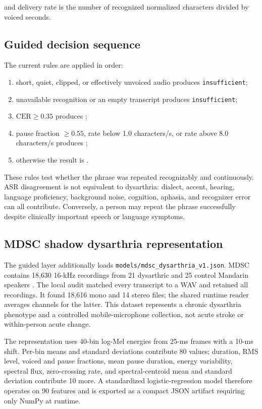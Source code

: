 \documentclass[11pt,a4paper]{article}
\begin{document}
and delivery rate is the number of recognized normalized characters divided by voiced seconds.

\subsection{Guided decision sequence}

The current rules are applied in order:

\begin{enumerate}
  \item short, quiet, clipped, or effectively unvoiced audio produces \texttt{insufficient};
  \item unavailable recognition or an empty transcript produces \texttt{insufficient};
  \item $\mathrm{CER}\geq0.35$ produces ;
  \item pause fraction $\geq0.55$, rate below 1.0 characters/s, or rate above 8.0 characters/s produces ;
  \item otherwise the result is .
\end{enumerate}

These rules test whether the phrase was repeated recognizably and continuously. ASR disagreement is not equivalent to dysarthria: dialect, accent, hearing, language proficiency, background noise, cognition, aphasia, and recognizer error can all contribute. Conversely, a person may repeat the phrase successfully despite clinically important speech or language symptoms.

\subsection{MDSC shadow dysarthria representation}

The guided layer additionally loads \texttt{models/mdsc\_dysarthria\_v1.json}. MDSC contains 18,630 16-kHz recordings from 21 dysarthric and 25 control Mandarin speakers \cite{gao2024mdsc}. The local audit matched every transcript to a WAV and retained all recordings. It found 18,616 mono and 14 stereo files; the shared runtime reader averages channels for the latter. This dataset represents a chronic dysarthria phenotype and a controlled mobile-microphone collection, not acute stroke or within-person acute change.

The representation uses 40-bin log-Mel energies from 25-ms frames with a 10-ms shift. Per-bin means and standard deviations contribute 80 values; duration, RMS level, voiced and pause fractions, mean pause duration, energy variability, spectral flux, zero-crossing rate, and spectral-centroid mean and standard deviation contribute 10 more. A standardized logistic-regression model therefore operates on 90 features and is exported as a compact JSON artifact requiring only NumPy at runtime.
\end{document}
